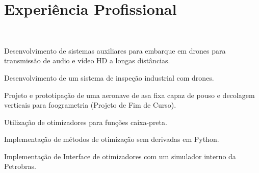 \documentclass[A4]{deedy-resume} %
\begin{document}
\begin{minipage}[t]{0.66\textwidth} %



\section{Experiência Profissional}

\\
\vspace{\topsep}
\begin{tightitemize}
 \item Desenvolvimento de sistemas auxiliares para embarque em drones para transmissão de audio e vídeo HD a longas distâncias.
 \item Desenvolvimento de um sistema de inspeção industrial com drones.
 \item Projeto e prototipação de uma aeronave de asa fixa capaz de pouso e decolagem verticais para foogrametria (Projeto de Fim de Curso).
\end{tightitemize}
\sectionspace %

\begin{tightitemize}
 \item Utilização de otimizadores para funções caixa-preta.
 \item Implementação de métodos de otimização sem derivadas em Python.
 \item Implementação de Interface de otimizadores com um simulador interno da Petrobras.

\end{tightitemize}

\sectionspace %



\end{minipage}
\end{document}
